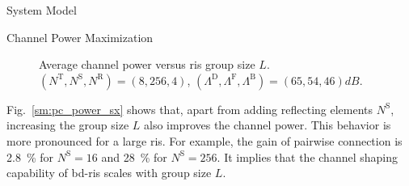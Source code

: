 \documentclass[journal]{IEEEtran}
\begin{document}
\begin{section}{System Model}
\begin{subsection}{Channel Power Maximization}
		\begin{figure}[!t]
			\centering
			\caption{Average channel power versus \gls{ris} group size $L$. $(N^\mathrm{T}, N^\mathrm{S}, N^\mathrm{R}) = (8, 256, 4)$, $(\Lambda^\mathrm{D}, \Lambda^\mathrm{F}, \Lambda^\mathrm{B}) = (65, 54, 46) \unit{dB}$.}
			\label{sm:pc_power_bond}
		\end{figure}
		Fig.~\ref{sm:pc_power_sx} shows that, apart from adding reflecting elements $N^\mathrm{S}$, increasing the group size $L$ also improves the channel power.
		This behavior is more pronounced for a large \gls{ris}.
		For example, the gain of pairwise connection is \qty{2.8}{\percent} for $N^\mathrm{S} = 16$ and \qty{28}{\percent} for $N^\mathrm{S} = 256$.
		It implies that the channel shaping capability of \gls{bd}-\gls{ris} scales with group size $L$.


\end{subsection}
\end{section}
\end{document}
